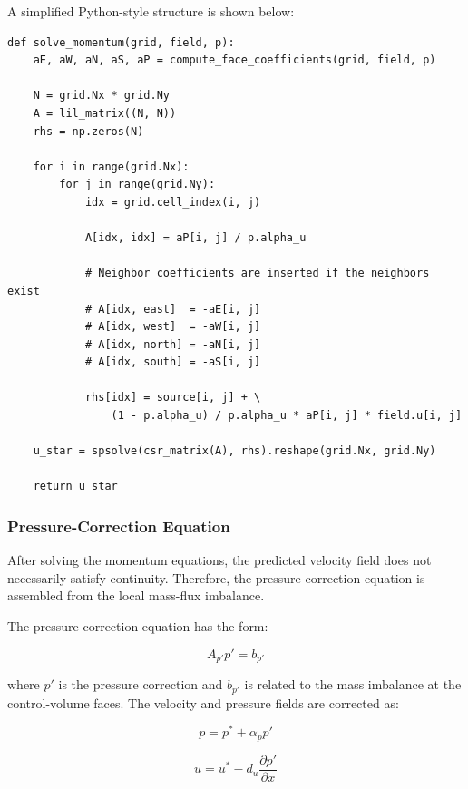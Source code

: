 \documentclass[12pt,a4paper]{article}
\begin{document}
A simplified Python-style structure is shown below:

\begin{lstlisting}[style=cleanPython, caption={Simplified momentum-equation solver structure.}]
def solve_momentum(grid, field, p):
    aE, aW, aN, aS, aP = compute_face_coefficients(grid, field, p)

    N = grid.Nx * grid.Ny
    A = lil_matrix((N, N))
    rhs = np.zeros(N)

    for i in range(grid.Nx):
        for j in range(grid.Ny):
            idx = grid.cell_index(i, j)

            A[idx, idx] = aP[i, j] / p.alpha_u

            # Neighbor coefficients are inserted if the neighbors exist
            # A[idx, east]  = -aE[i, j]
            # A[idx, west]  = -aW[i, j]
            # A[idx, north] = -aN[i, j]
            # A[idx, south] = -aS[i, j]

            rhs[idx] = source[i, j] + \
                (1 - p.alpha_u) / p.alpha_u * aP[i, j] * field.u[i, j]

    u_star = spsolve(csr_matrix(A), rhs).reshape(grid.Nx, grid.Ny)

    return u_star
\end{lstlisting}






\subsubsection{Pressure-Correction Equation}

After solving the momentum equations, the predicted velocity field does not necessarily
satisfy continuity. Therefore, the pressure-correction equation is assembled from the
local mass-flux imbalance.

The pressure correction equation has the form:

\begin{equation}
    A_{p'}p' = b_{p'}
\end{equation}

where $p'$ is the pressure correction and $b_{p'}$ is related to the mass imbalance at
the control-volume faces. The velocity and pressure fields are corrected as:

\begin{equation}
    p = p^* + \alpha_p p'
\end{equation}

\begin{equation}
    u = u^* - d_u\frac{\partial p'}{\partial x}
\end{equation}
\end{document}

